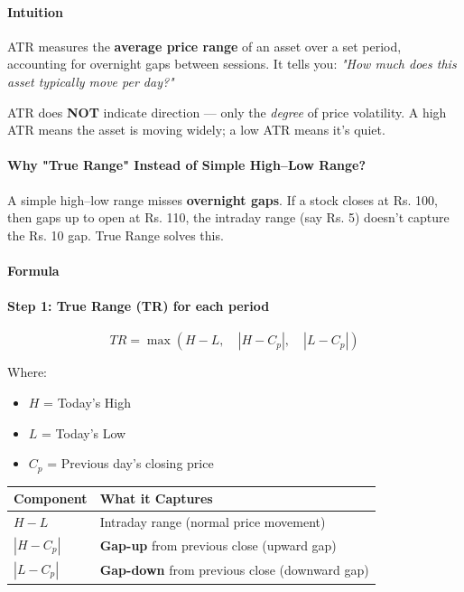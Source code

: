 \documentclass[12pt,openany]{book}
\begin{document}
\paragraph{Intuition}
ATR measures the \textbf{average price range} of an asset over a set period, accounting for overnight gaps between sessions. It tells you: \emph{"How much does this asset typically move per day?"}

ATR does \textbf{NOT} indicate direction --- only the \emph{degree} of price volatility. A high ATR means the asset is moving widely; a low ATR means it's quiet.

\paragraph{Why "True Range" Instead of Simple High--Low Range?}

A simple high--low range misses \textbf{overnight gaps}. If a stock closes at Rs. 100, then gaps up to open at Rs. 110, the intraday range (say Rs. 5) doesn't capture the Rs. 10 gap. True Range solves this.

\paragraph{Formula}

\paragraph{Step 1: True Range (TR) for each period}

\[
TR = \max\left(H - L, \quad |H - C_p|, \quad |L - C_p|\right)
\]

Where:
\begin{itemize}[leftmargin=*]
    \item \(H\) = Today's High
    \item \(L\) = Today's Low
    \item \(C_p\) = Previous day's closing price
\end{itemize}

\begin{center}
\small
\renewcommand{\arraystretch}{1.2}
\begin{tabular}{|L{0.30\textwidth}|L{0.60\textwidth}|}
\hline
 \textbf{Component} & \textbf{What it Captures} \\ \hline
 \(H - L\) & Intraday range (normal price movement) \\ \hline
 \(|H - C_p|\) & \textbf{Gap-up} from previous close (upward gap) \\ \hline
 \(|L - C_p|\) & \textbf{Gap-down} from previous close (downward gap) \\ \hline
\end{tabular}
\end{center}
\end{document}
